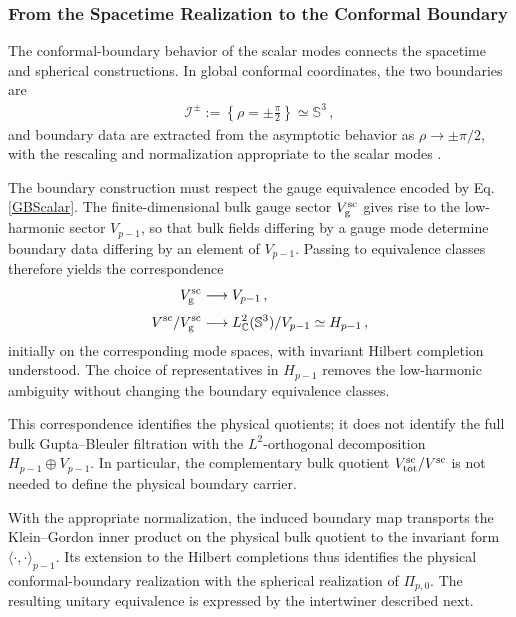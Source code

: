\documentclass{SciPost}
\begin{document}
\subsubsection{From the Spacetime Realization to the Conformal Boundary}

The conformal-boundary behavior of the scalar modes connects the spacetime and spherical constructions. In global conformal coordinates, the two boundaries are
\begin{align}
    \mathscr I^\pm
    :=
    \left\{\rho=\pm\frac{\pi}{2}\right\}
    \simeq\mathbb S^3 \,,
\end{align}
and boundary data are extracted from the asymptotic behavior as $\rho\to\pm\pi/2$, with the rescaling and normalization appropriate to the scalar modes \cite{Bajalan2026}.

The boundary construction must respect the gauge equivalence encoded by Eq. \eqref{GBScalar}. The finite-dimensional bulk gauge sector $V_{\rm g}^{\rm sc}$ gives rise to the low-harmonic sector $V_{p-1}$, so that bulk fields differing by a gauge mode determine boundary data differing by an element of $V_{p-1}$. Passing to equivalence classes therefore yields the correspondence
\begin{align}
    V_{\rm g}^{\rm sc}
    &\longrightarrow V_{p-1} \,,
    \\[3pt]
    V^{\rm sc}/V_{\rm g}^{\rm sc}
    &\longrightarrow
    L^2_{\mathbb C}(\mathbb S^3)/V_{p-1}
    \simeq H_{p-1} \,,
\end{align}
initially on the corresponding mode spaces, with invariant Hilbert completion understood. The choice of representatives in $H_{p-1}$ removes the low-harmonic ambiguity without changing the boundary equivalence classes.

This correspondence identifies the physical quotients; it does not identify the full bulk Gupta--Bleuler filtration with the $L^2$-orthogonal decomposition $H_{p-1}\oplus V_{p-1}$. In particular, the complementary bulk quotient $V_{\rm tot}^{\rm sc}/V^{\rm sc}$ is not needed to define the physical boundary carrier.

With the appropriate normalization, the induced boundary map transports the Klein--Gordon inner product on the physical bulk quotient to the invariant form $\langle\cdot,\cdot\rangle_{p-1}$. Its extension to the Hilbert completions thus identifies the physical conformal-boundary realization with the spherical realization of $\Pi_{p,0}$. The resulting unitary equivalence is expressed by the intertwiner described next.
\end{document}
